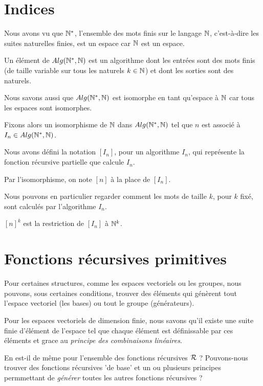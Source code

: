 \section{Indices}

Nous avons vu que $\mathbb{N}^{*}$, l'ensemble des mots finis sur le langage
$\mathbb{N}$, c'est-à-dire les suites naturelles finies, est un espace car
$\mathbb{N}$ est un espace.

Un élément de $Alg(\mathbb{N}^{*}, \mathbb{N})$ est un algorithme dont les entrées
sont des mots finis (de taille variable sur tous les naturels $k \in \mathbb{N}$)
et dont les sorties sont des naturels.

Nous savons aussi que $Alg(\mathbb{N}^{*}, \mathbb{N})$ est isomorphe en tant qu'espace
à $\mathbb{N}$ car tous les espaces sont isomorphes.

Fixons alors un isomorphisme de $\mathbb{N}$ dans $Alg(\mathbb{N}^{*},
\mathbb{N})$ tel que $n$ est associé à $I_{n} \in Alg(\mathbb{N}^{*}, \mathbb{N})$.

Nous avons défini la notation $[I_{n}]$, pour un algorithme $I_{n}$, qui
représente la fonction récursive partielle que calcule $I_{n}$.

Par l'isomorphisme, on note $[n]$ à la place de $[I_{n}]$.

Nous pouvons en particulier regarder comment les mots de taille $k$, pour $k$
fixé, sont calculés par l'algorithme $I_{n}$.

\begin{notation}
	$[n]^{k}$ est la restriction de $[I_{n}]$ à $\mathbb{N}^{k}$.
\end{notation}


\section{Fonctions récursives primitives}

Pour certaines structures, comme les espaces vectoriels ou les groupes, nous
pouvons, sous certaines conditions, trouver des éléments qui génèrent tout
l'espace vectoriel (les bases) ou tout le groupe (générateurs).

Pour les espaces vectoriels de dimension finie, nous savons qu'il existe une
suite finie d'élément de l'espace tel que chaque élément est définissable par
ces éléments et grace au \textit{principe des combinaisons linéaires}.

En est-il de même pour l'ensemble des fonctions récursives
$\mathcal{R}$ ? Pouvons-nous trouver des fonctions récursives 'de
base' et un ou plusieurs principes permmettant de \textit{générer} toutes les
autres fonctions récursives ?

